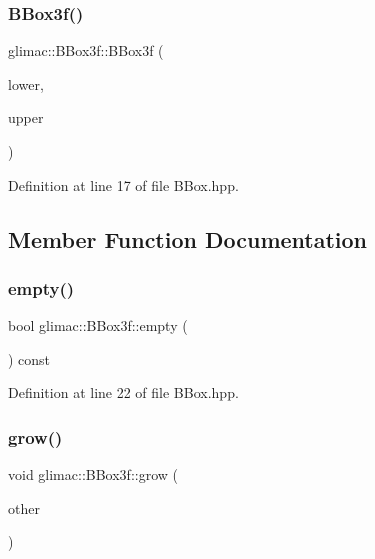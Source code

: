 \subsubsection{\texorpdfstring{B\+Box3f()}{BBox3f()}\hspace{0.1cm}{\footnotesize\ttfamily [4/4]}}
{\footnotesize\ttfamily glimac\+::\+B\+Box3f\+::\+B\+Box3f (\begin{DoxyParamCaption}\item[{const \hyperlink{group__core__types_ga1c47e8b3386109bc992b6c48e91b0be7}{glm\+::vec3} \&}]{lower,  }\item[{const \hyperlink{group__core__types_ga1c47e8b3386109bc992b6c48e91b0be7}{glm\+::vec3} \&}]{upper }\end{DoxyParamCaption})\hspace{0.3cm}{\ttfamily [inline]}}



Definition at line 17 of file B\+Box.\+hpp.



\subsection{Member Function Documentation}
\mbox{\label{structglimac_1_1_b_box3f_a96444ed68bfab6e7c648467f2e8f9218}} 
\subsubsection{\texorpdfstring{empty()}{empty()}}
{\footnotesize\ttfamily bool glimac\+::\+B\+Box3f\+::empty (\begin{DoxyParamCaption}{ }\end{DoxyParamCaption}) const\hspace{0.3cm}{\ttfamily [inline]}}



Definition at line 22 of file B\+Box.\+hpp.

\mbox{\label{structglimac_1_1_b_box3f_adce98ea70025deadd71e0467435d654a}} 
\subsubsection{\texorpdfstring{grow()}{grow()}\hspace{0.1cm}{\footnotesize\ttfamily [1/2]}}
{\footnotesize\ttfamily void glimac\+::\+B\+Box3f\+::grow (\begin{DoxyParamCaption}\item[{const \hyperlink{structglimac_1_1_b_box3f}{B\+Box3f} \&}]{other }\end{DoxyParamCaption})\hspace{0.3cm}{\ttfamily [inline]}}



